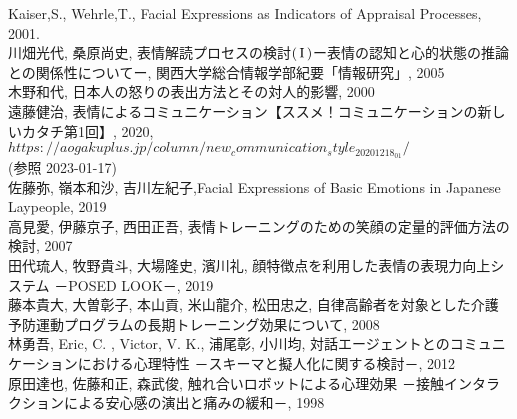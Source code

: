\documentclass[titlepage]{jarticle}
\begin{document}
 
\newpage
\begin{thebibliography}{99}
\large
{
Kaiser,S., Wehrle,T., Facial Expressions as Indicators of Appraisal Processes, 2001.\\

川畑光代, 桑原尚史, 表情解読プロセスの検討$\rm(\,I\,)$ー表情の認知と心的状態の推論との関係性についてー, 関西大学総合情報学部紀要「情報研究」, 2005\\

木野和代, 日本人の怒りの表出方法とその対人的影響, 2000\\

遠藤健治, 表情によるコミュニケーション【ススメ！コミュニケーションの新しいカタチ第1回】, 2020,\\
$https://aogakuplus.jp/column/new_communication_style_20201218_01/$\\(参照 2023-01-17)\\

佐藤弥, 嶺本和沙, 吉川左紀子,Facial Expressions of Basic Emotions in Japanese Laypeople, 2019\\

高見愛, 伊藤京子, 西田正吾, 表情トレーニングのための笑顔の定量的評価方法の検討, 2007\\

田代琉人, 牧野貴斗, 大場隆史, 濱川礼, 顔特徴点を利用した表情の表現力向上システム
－POSED LOOK－, 2019\\

藤本貴大, 大曽彰子, 本山貢, 米山龍介, 松田忠之, 自律高齢者を対象とした介護予防運動プログラムの長期トレーニング効果について, 2008\\

林勇吾, Eric, C. , Victor, V. K., 浦尾彰, 小川均, 対話エージェントとのコミュニケーションにおける心理特性 －スキーマと擬人化に関する検討－, 2012\\

原田達也, 佐藤和正, 森武俊, 触れ合いロボットによる心理効果 －接触インタラクションによる安心感の演出と痛みの緩和－, 1998\\
}
\end{thebibliography}
\end{document}
